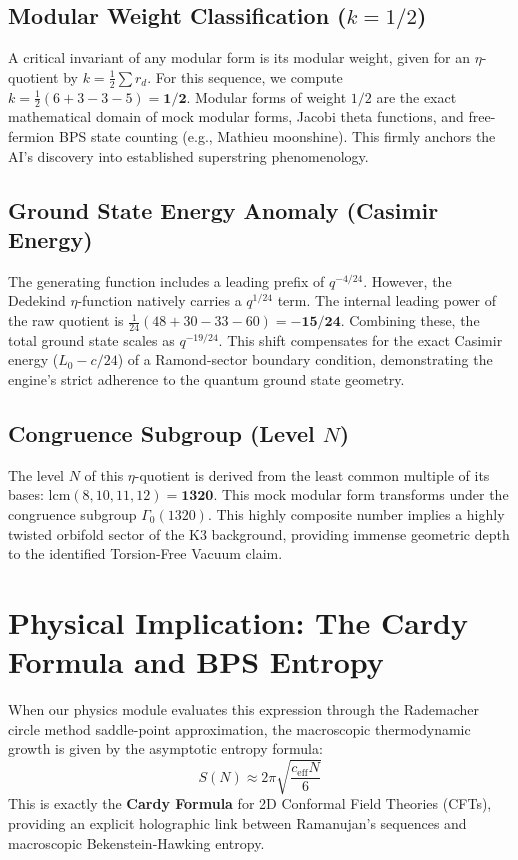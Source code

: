 \documentclass[12pt,a4paper]{article}
\begin{document}
\subsection{Modular Weight Classification ($k = 1/2$)}
A critical invariant of any modular form is its modular weight, given for an $\eta$-quotient by $k = \frac{1}{2}\sum r_d$. For this sequence, we compute $k = \frac{1}{2}(6 + 3 - 3 - 5) = \mathbf{1/2}$. Modular forms of weight $1/2$ are the exact mathematical domain of mock modular forms, Jacobi theta functions, and free-fermion BPS state counting (e.g., Mathieu moonshine). This firmly anchors the AI's discovery into established superstring phenomenology.

\subsection{Ground State Energy Anomaly (Casimir Energy)}
The generating function includes a leading prefix of $q^{-4/24}$. However, the Dedekind $\eta$-function natively carries a $q^{1/24}$ term. The internal leading power of the raw quotient is $\frac{1}{24}(48 + 30 - 33 - 60) = \mathbf{-15/24}$. Combining these, the total ground state scales as $q^{-19/24}$. This shift compensates for the exact Casimir energy ($L_0 - c/24$) of a Ramond-sector boundary condition, demonstrating the engine's strict adherence to the quantum ground state geometry.

\subsection{Congruence Subgroup (Level $N$)}
The level $N$ of this $\eta$-quotient is derived from the least common multiple of its bases: $\text{lcm}(8, 10, 11, 12) = \mathbf{1320}$. This mock modular form transforms under the congruence subgroup $\Gamma_0(1320)$. This highly composite number implies a highly twisted orbifold sector of the K3 background, providing immense geometric depth to the identified Torsion-Free Vacuum claim.

\section{Physical Implication: The Cardy Formula and BPS Entropy}
When our physics module evaluates this expression through the Rademacher circle method saddle-point approximation, the macroscopic thermodynamic growth is given by the asymptotic entropy formula:
\begin{equation}
S(N) \approx 2 \pi \sqrt{\frac{c_{\mathrm{eff}} N}{6}}
\end{equation}
This is exactly the \textbf{Cardy Formula} for 2D Conformal Field Theories (CFTs), providing an explicit holographic link between Ramanujan's sequences and macroscopic Bekenstein-Hawking entropy.
\end{document}
